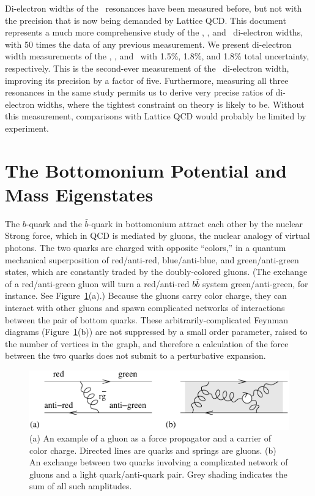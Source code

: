 \documentclass{cornell}
\begin{document}
Di-electron widths of the \ups\ resonances have been measured before,
but not with the precision that is now being demanded by Lattice QCD.
This document represents a much more comprehensive study of the \us,
\uss, and \usss\ di-electron widths, with 50 times the data of any
previous measurement.  We present di-electron width measurements of
the \us, \uss, and \usss\ with 1.5\%, 1.8\%, and 1.8\% total
uncertainty, respectively.  This is the second-ever measurement of the
\usss\ di-electron width, improving its precision by a factor of five.
Furthermore, measuring all three resonances in the same study permits
us to derive very precise ratios of di-electron widths, where the
tightest constraint on theory is likely to be.  Without this
measurement, comparisons with Lattice QCD would probably be limited by
experiment.

\section{The Bottomonium Potential and Mass Eigenstates}

The $b$-quark and the $\bar{b}$-quark in bottomonium attract each
other by the nuclear Strong force, which in QCD is mediated by gluons,
the nuclear analogy of virtual photons.  The two quarks are charged
with opposite ``colors,'' in a quantum mechanical superposition
of red/anti-red, blue/anti-blue, and green/anti-green states, which
are constantly traded by the doubly-colored gluons.  (The exchange of
a red/anti-green gluon will turn a red/anti-red $b\bar{b}$ system
green/anti-green, for instance.  See Figure~\ref{gluejunk}(a).)
Because the gluons carry color charge, they can interact with other
gluons and spawn complicated networks of interactions between the pair
of bottom quarks.  These arbitrarily-complicated Feynman diagrams
(Figure~\ref{gluejunk}(b)) are not suppressed by a small order
parameter, raised to the number of vertices in the graph, and
therefore a calculation of the force between the two quarks does not
submit to a perturbative expansion.

\begin{figure}[p]
  \begin{center}
    \includegraphics[width=\linewidth]{plots/gluejunk}
  \end{center}
  \caption{\label{gluejunk} (a) An example of a gluon as a force
  propagator and a carrier of color charge.  Directed lines are quarks
  and springs are gluons.  (b) An exchange between two quarks
  involving a complicated network of gluons and a light
  quark/anti-quark pair.  Grey shading indicates the sum of all such
  amplitudes.}
\end{figure}
\end{document}
